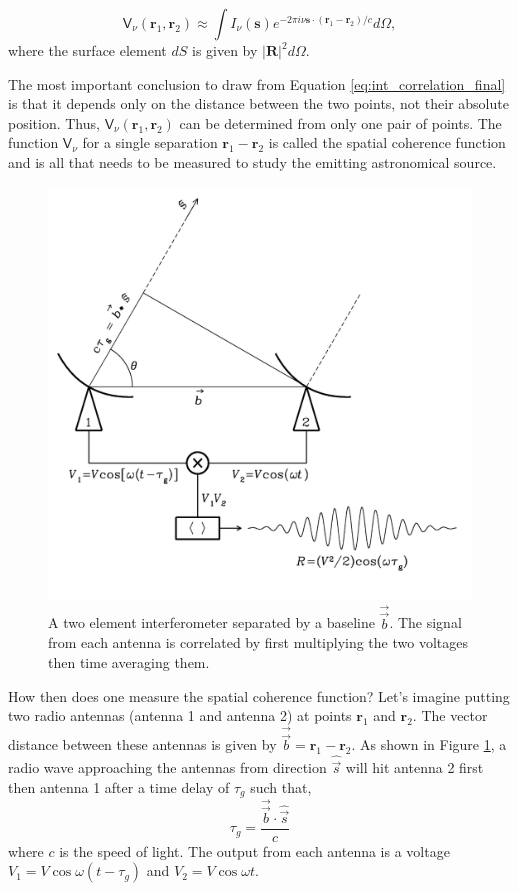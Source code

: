 \begin{equation}
\label{eq:int_correlation_final}
\mathsf{V}_\nu (\mathbf{r}_1, \mathbf{r}_2) \approx \int I_\nu(\mathbf{s}) e^{-2 \pi i \nu\mathbf{s} \cdot (\mathbf{r}_1 - \mathbf{r}_2)/c} d\Omega,
\end{equation}
where the surface element $dS$ is given by $\vert \mathbf{R} \vert ^2 d\Omega$.

The most important conclusion to draw from Equation \ref{eq:int_correlation_final} is that it depends only on the distance between the two points, not their absolute position. Thus, $\mathsf{V}_\nu (\mathbf{r}_1, \mathbf{r}_2)$ can be determined from only one pair of points. The function $\mathsf{V}_\nu$ for a single separation $\mathbf{r}_1 - \mathbf{r}_2$ is called the spatial coherence function and is all that needs to be measured to study the emitting astronomical source.

\begin{figure}[ht]
    \centering
    \includegraphics[width=0.75\columnwidth]{Images/2_elem_int.png}
    \caption[A two element interferometer]{A two element interferometer separated by a baseline $\overrightarrow{\Vec{b}}$. The signal from each antenna is correlated by first multiplying the two voltages then time averaging them.}
    \label{fig:2_el_int}
\end{figure}

How then does one measure the spatial coherence function? Let's imagine putting two radio antennas (antenna 1 and antenna 2) at points $\mathbf{r}_1$ and $\mathbf{r}_2$. The vector distance between these antennas is given by $\overrightarrow{\Vec{b}} = \mathbf{r}_1 - \mathbf{r}_2$. As shown in Figure \ref{fig:2_el_int}, a radio wave approaching the antennas from direction $\hat{\Vec{s}}$  will hit antenna 2 first then antenna 1 after a time delay of $\tau_g$ such that,
\begin{equation}
\label{eq:time_delay}
\tau_g = \frac{\overrightarrow{\Vec{b}} \cdot \hat{\Vec{s}}}{c}
\end{equation}
where $c$ is the speed of light. The output from each antenna is a voltage $V_1 = V \cos{\omega(t - \tau_g)}$ and $V_2 = V\cos{\omega t}$. 



